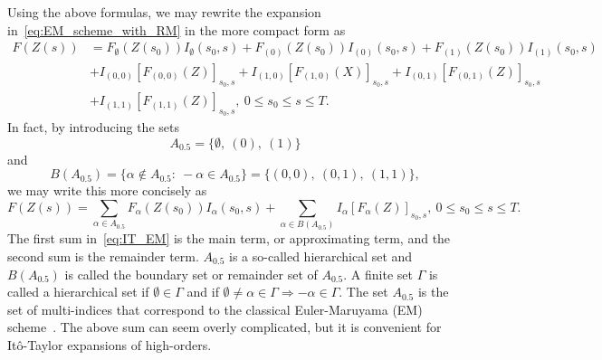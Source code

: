 \documentclass[11pt]{amsart}
\begin{document}
{Using the above formulas, we may rewrite the expansion in~\eqref{eq:EM_scheme_with_RM} in the more compact form as
\begin{equation}\label{eq:IT_F_EM}
  \begin{split}
    F(Z(s)) &= F_{\emptyset}(Z(s_{0})) I_{\emptyset}(s_{0},s) + F_{(0)}(Z(s_{0})) I_{(0)}(s_{0},s) + F_{(1)}(Z(s_{0})) I_{(1)}(s_{0},s) \\ &+ I_{(0,0)}[F_{(0,0)}(Z)]_{s_{0},s} + I_{(1,0)}[F_{(1,0)}(X)]_{s_{0},s} + I_{(0,1)}[F_{(0,1)}(Z)]_{s_{0},s} \\ &+ I_{(1,1)}[F_{(1,1)}(Z)]_{s_{0},s},\ 0 \leq s_{0} \leq s \leq T.
  \end{split}
\end{equation}
In fact, by introducing the sets
\begin{equation}\label{eq:index_A_EM}
A_{0.5} = \{ \emptyset,\ (0),\ (1) \}
\end{equation}
and
\begin{equation}\label{eq:index_B_EM}
B(A_{0.5}) = \{ \alpha \not\in A_{0.5}:\ -\alpha \in A_{0.5} \} = \{ (0,0),\ (0,1),\ (1,1) \},
\end{equation}
we may write this more concisely as
\begin{equation}\label{eq:IT_EM}
F(Z(s)) = \sum_{\alpha \in A_{0.5}} F_{\alpha}(Z(s_{0})) I_{\alpha}(s_{0},s) + \sum_{\alpha \in B(A_{0.5})} I_{\alpha}[F_{\alpha}(Z)]_{s_{0},s},\ 0 \leq s_{0} \leq s \leq T.
\end{equation}
The first sum in~\eqref{eq:IT_EM} is the main term, or approximating term, and the second sum is the remainder term. $A_{0.5}$ is a so-called hierarchical set and $B(A_{0.5})$ is called the boundary set or remainder set of $A_{0.5}$. A finite set $\Gamma$ is called a hierarchical set if $\emptyset \in \Gamma$ and if $\emptyset \neq \alpha \in \Gamma \Rightarrow -\alpha \in \Gamma$. The set $A_{0.5}$ is the set of multi-indices that correspond to the classical Euler-Maruyama (EM) scheme~\cite{MR71666}. The above sum can seem overly complicated, but it is convenient for Itô-Taylor expansions of high-orders.

}
\end{document}
